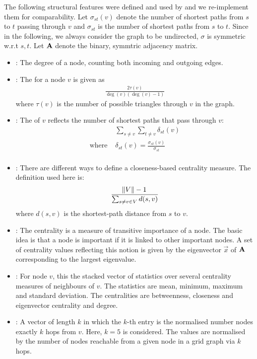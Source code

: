 \documentclass[
	fontsize=10pt, %
	twoside=false, %
	secnumdepth=1, %
]{kaobook}
\begin{document}
The following structural features were defined and used by
\citeauthor{nielsen_MachineLearningSupport_2019} and we re-implement them for
comparability. Let $\sigma_{st}(v)$ denote the number of shortest paths from $s$
to $t$ passing through $v$ and $\sigma_{st}$ is the number of shortest paths
from $s$ to $t$. Since in the following, we always consider the graph to be
undirected, $\sigma$ is symmetric w.r.t $s, t$. Let $\mathbf{A}$ denote the binary,
symmtric adjacency matrix.

\begin{itemize}
\item {}: The degree of a node, counting both incoming and
  outgoing edges.
\item {}: The 
  \cite{brandes_NetworkAnalysisMethodological_2005}
  for a
  node $v$ is given as
  \begin{align*}
    \frac{2 \tau(v)}{\deg(v)(\deg(v)-1)}
  \end{align*}
  where $\tau(v)$ is the number of possible triangles through $v$ in the graph.
\item {}: The  of $v$
  reflects the number of shortest paths that pass through $v$:
  \begin{align*}
    & \sum_{s \not= v} \sum_{t \not= v} \delta_{st}(v) \\
    \text{where~} & \delta_{st}(v) = \frac{\sigma_{st}(v)}{\sigma_{st}} \\
  \end{align*}
  \item {}: There are different ways to define a
  closeness-based centrality measure. The definition used here is:
  \begin{align*}
    \frac{\norm{V}-1}{\sum_{s \not= v \in V} d(s,v)}
  \end{align*}
  where $d(s,v)$ is the shortest-path distance from $s$ to $v$.
\item {}: The  centrality is a
  measure of transitive importance of a node. The basic idea is that a node is
  important if it is linked to other important nodes. A set of centrality values
  reflecting this notion is given by the eigenvector $\vec x$ of $\mathbf{A}$
  corresponding to the largest eigenvalue.
\item {}: For node $v$, this the stacked
  vector of statistics over several centrality measures of neighbours of $v$.
  The statistics are mean, minimum, maximum and standard deviation. The
  centralities are betweenness, closeness and eigenvector centrality and degree.
\item {}: A vector of length $k$ in which the $k$-th
  entry is the normalised number nodes exactly $k$ hops from $v$. Here, $k=5$ is
  considered. The values are normalised by the number of nodes reachable from a
  given node in a grid graph via $k$ hops.
\end{itemize}
\end{document}
